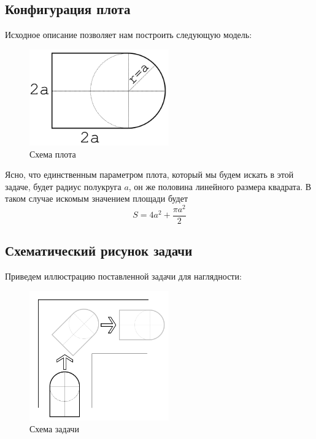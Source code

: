 \documentclass[12pt,a4paper]{article}
\begin{document}
		\subsection{Конфигурация плота}
			Исходное описание позволяет нам построить следующую модель:
			\begin{figure}[H]\label{fig:sofa}
				\centering
				\includegraphics[width=6cm]{res/sofa.png}
				\caption{Схема плота}
			\end{figure}
			Ясно, что единственным параметром плота, который мы будем искать в этой задаче, будет радиус полукруга $a$, он же половина линейного размера квадрата. В таком случае искомым значением площади будет
			\begin{equation}\label{eq:area}
				S = 4a^2 + \frac{\pi a^2}{2}
			\end{equation}
			
		\subsection{Схематический рисунок задачи}
			Приведем иллюстрацию поставленной задачи для наглядности:
			\begin{figure}[H]\label{fig:scheme}
				\centering
				\includegraphics[width=6cm]{res/scheme.png}
				\caption{Схема задачи}
			\end{figure}
		
\end{document}
